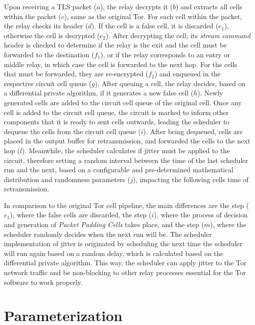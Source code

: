 Upon receiving a TLS packet (\(a\)), the relay decrypts it (\(b\)) and extracts all cells within the packet (\(c\)), same as the original Tor. For each cell within the packet, the relay checks its header (\(d\)). If the cell is a false cell, it is discarded (\(e_1\)), otherwise the cell is decrypted (\(e_2\)). After decrypting the cell, its \textit{stream command} header is checked to determine if the relay is the exit and the cell must be forwarded to the destination (\(f_1\)), or if the relay corresponds to an entry or middle relay, in which case the cell is forwarded to the next hop. For the cells that must be forwarded, they are re-encrypted (\(f_2\)) and enqueued in the respective circuit cell queue (\(g\)). After queuing a cell, the relay decides, based on a differential private algorithm, if it generates a new false cell (\(h\)). Newly generated cells are added to the circuit cell queue of the original cell. Once any cell is added to the circuit cell queue, the circuit is marked to inform other components that it is ready to sent cells outwards, leading the scheduler to dequeue the cells from the circuit cell queue (\(i\)). After being dequeued, cells are placed in the output buffer for retransmission, and forwarded the cells to the next hop (\(l\)). Meanwhile, the scheduler calculates if jitter must be applied to the circuit, therefore setting a random interval between the time of the last scheduler run and the next, based on a configurable and pre-determined mathematical distribution and randomness parameters (\(j\)), impacting the following cells time of retransmission. 

In comparison to the original Tor cell pipeline, the main differences are the step (\(e_1\)), where the false cells are discarded, the step (\(i\)), where the process of decision and generation of \textit{Packet Padding Cells} takes place, and the step (\(m\)), where the scheduler randomly decides when the next run will be. The scheduler implementation of jitter is originated by scheduling the next time the scheduler will run again based on a random delay, which is calculated based on the differential private algorithm. This way, the scheduler can apply jitter to the Tor network traffic and be non-blocking to other relay processes essential for the Tor software to work properly. 


\section{Parameterization}\label{sec:parameterization}

